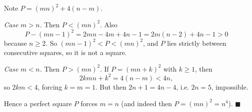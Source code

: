 Note $P=(mn)^2+4(n-m)$.

\emph{Case $m>n$.} Then $P<(mn)^2$. Also
\[
P-(mn-1)^2=2mn-4m+4n-1=2m(n-2)+4n-1>0
\]
because $n\ge2$. So $(mn-1)^2<P<(mn)^2$, and $P$ lies strictly between consecutive squares, so it is not a square.

\emph{Case $m<n$.} Then $P>(mn)^2$. If $P=(mn+k)^2$ with $k\ge1$, then
\[
2kmn+k^2=4(n-m)<4n ,
\]
so $2km<4$, forcing $k=m=1$. But then $2n+1=4n-4$, i.e. $2n=5$, impossible.

Hence a perfect square $P$ forces $m=n$ (and indeed then $P=(mn)^2=n^4$). $\blacksquare$
